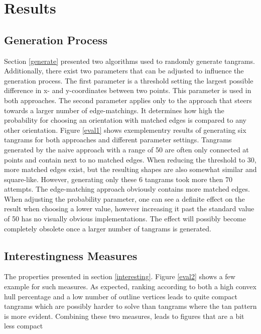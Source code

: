 \chapter{Results}\label{chapter:results}

\section{Generation Process}

Section \ref{generate} presented two algorithms used to randomly generate tangrams. Additionally, there exist two parameters that can be adjusted to influence the generation process. The first parameter is a threshold setting the largest possible difference in x- and y-coordinates between two points. This parameter is used in both approaches. The second parameter applies only to the approach that steers towards a larger number of edge-matchings. It determines how high the probability for choosing an orientation with matched edges is compared to any other orientation. Figure \ref{eval1} shows exemplementry results of generating six tangrams for both approaches and different parameter settings. Tangrams generated by the naive approach with a range of 50 are often only connected at points and contain next to no matched edges. When reducing the threshold to 30, more matched edges exist, but the resulting shapes are also somewhat similar and square-like. However, generating only these 6 tangrams took more then 70 attempts. The edge-matching approach obviously contains more matched edges. When adjusting the probability parameter, one can see a definite effect on the result when choosing a lower value, however increasing it past the standard value of 50 has no visually obvious implementations. The effect will possibly become completely obsolete once a larger number of tangrams is generated. 



\section{Interestingness Measures}

The properties presented in section \ref{interesting}. Figure \ref{eval2} shows a few example for such measures. As expected, ranking according to both a high convex hull percentage and a low number of outline vertices leads to quite compact tangrams which are possibly harder to solve than tangrams where the tan pattern is more evident. Combining these two measures, leads to figures that are a bit less compact 

